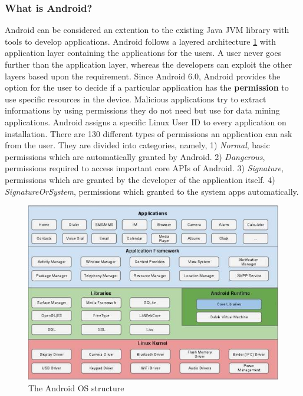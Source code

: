 \documentclass[runningheads]{llncs}
\begin{document}
\subsubsection{What is Android?}
Android can be considered an extention to the existing Java JVM library with tools to develop applications.
Android follows a layered architecture \ref{fig1} with application layer containing the applications for the users.
A user never goes further than the application layer, whereas the developers can exploit the other layers based upon the requirement.
Since Android 6.0, Android provides the option for the user to decide if a particular application has the \textbf{permission} 
to use specific resources in the device. Malicious applications try to extract informations by using permissions they do not need but 
use for data mining applications. Android assigns a specific Linux User ID to every application on installation. There are 130 different types of 
permissions an application can ask from the user. They are divided into categories, namely, 1) \textit{Normal}, basic permissions which are automatically granted
by Android. 2) \textit{Dangerous}, permissions required to access important core APIs of Android. 3) \textit{Signature}, permissions which are granted by the developer of the application itself.
4) \textit{SignatureOrSystem}, permissions which granted to the system apps automatically. 
\begin{figure}
    \includegraphics[width=\textwidth]{images/architecture.jpg}
    \caption{The Android OS structure} \label{fig1}
\end{figure}
\end{document}
